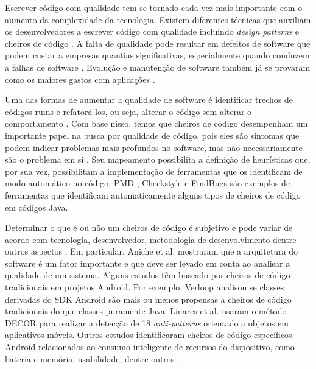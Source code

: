 Escrever código com qualidade tem se tornado cada vez mais importante com o aumento da complexidade da tecnologia. Existem diferentes técnicas que auxiliam os desenvolvedores a escrever código com qualidade incluindo \textit{design patterns} \cite{gof} e cheiros de código \cite{Refactoring:99}. A falta de qualidade pode resultar em defeitos de software que podem custar a empresas quantias significativas, especialmente quando conduzem a falhas de software \cite{Nagappan:2005, briand1993modeling}. Evolução e manutenção de software também já se provaram como os maiores gastos com aplicações \cite{RefactoringAndImprovements:10}.

Uma das formas de aumentar a qualidade de software é identificar trechos de códigos ruins e refatorá-los, ou seja, alterar o código sem alterar o comportamento \cite{Refactoring:99}. Com base nisso, temos que cheiros de código desempenham um importante papel na busca por qualidade de código, pois eles são sintomas que podem indicar problemas mais profundos no software, mas não necessariamente são o problema em si \cite{CodeSmell:06}. Seu mapeamento possibilita a definição de heurísticas que, por sua vez, possibilitam a implementação de ferramentas que os identificam de modo automático no código. PMD \cite{PMD2016}, Checkstyle e FindBugs são exemplos de ferramentas que identificam automaticamente alguns tipos de cheiros de código em códigos Java.

Determinar o que é ou não um cheiros de código é subjetivo e pode variar de acordo com tecnologia, desenvolvedor, metodologia de desenvolvimento dentre outros aspectos \cite{WikiCodeSmell}. Em particular, Aniche et al. \cite{MvcSmells:16,aniche2016satt} mostraram que a arquitetura do software é um fator importante e que deve ser levado em conta ao analisar a qualidade de um sistema.   Alguns estudos têm buscado por cheiros de código tradicionais em projetos Android. Por exemplo, Verloop \cite{MobileSmells:13} analisou se classes derivadas do SDK Android são mais ou menos propensas a cheiros de código tradicionais do que classes puramente Java. Linares et al. \cite{DomainMatters} usaram o método DECOR para realizar a detecção de 18 \textit{anti-patterns} orientado a objetos em aplicativos móveis. Outros estudos identificaram cheiros de código específicos Android relacionados ao consumo inteligente de recursos do dispositivo, como bateria e memória, usabilidade, dentre outros \cite{EnergyAndroidSmells, ReimannBrylski2013}. 

